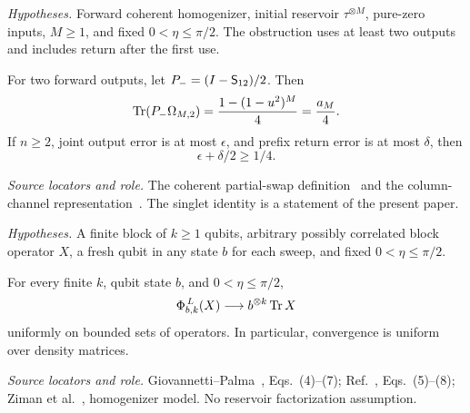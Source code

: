 \documentclass[11pt]{article}
\begin{document}
\par\medskip
\noindent\begin{minipage}{\linewidth}
\emph{Hypotheses.} Forward coherent homogenizer, initial reservoir $\tau^{\otimes M}$, pure-zero inputs, $M\ge1$, and fixed $0<\eta\le\pi/2$. The obstruction uses at least two outputs and includes return after the first use.

\begin{theorem}
For two forward outputs, let $P_-=(I-\mathsf S_{12})/2$. Then
\begin{equation}
 \operatorname{Tr}(P_-\Omega_{M,2})=\frac{1-(1-u^2)^M}{4}=\frac{a_M}{4}.
\end{equation}
If $n\ge2$, joint output error is at most $\epsilon$, and prefix return error is at most $\delta$, then
\begin{equation}
 \epsilon+\delta/2\ge1/4.
\end{equation}
\end{theorem}

\noindent\emph{Source locators and role.} The coherent partial-swap definition~\cite{ziman} and the column-channel representation~\cite{gp,cascade}. The singlet identity is a statement of the present paper.
\end{minipage}
\par

\par\medskip
\noindent\begin{minipage}{\linewidth}
\emph{Hypotheses.} A finite block of $k\ge1$ qubits, arbitrary possibly correlated block operator $X$, a fresh qubit in any state $b$ for each sweep, and fixed $0<\eta\le\pi/2$.

\begin{lemma}
For every finite $k$, qubit state $b$, and $0<\eta\le\pi/2$,
\begin{equation}
 \Phi_{b,k}^{\,L}(X)\longrightarrow b^{\otimes k}\operatorname{Tr} X
\end{equation}
uniformly on bounded sets of operators. In particular, convergence is uniform over density matrices.
\end{lemma}

\noindent\emph{Source locators and role.} Giovannetti--Palma~\cite{gp}, Eqs.~(4)--(7); Ref.~\cite{cascade}, Eqs.~(5)--(8); Ziman et al.~\cite{ziman}, homogenizer model. No reservoir factorization assumption.
\end{minipage}
\par
\end{document}
